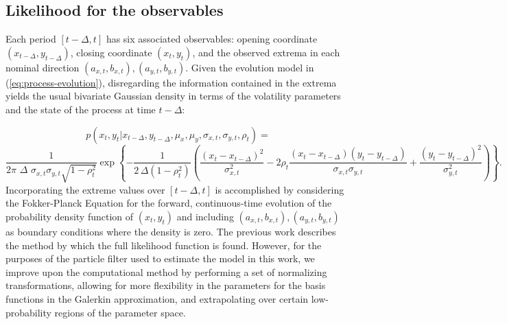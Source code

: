 \documentclass[10pt]{article}
\begin{document}
\subsection{Likelihood for the observables}
Each period $[t-\Delta,t]$ has six associated observables: opening
coordinate $(x_{t-\Delta},y_{t-\Delta})$, closing coordinate
$(x_{t},y_{t})$, and the observed extrema in each nominal direction
$(a_{x,t}, b_{x,t}), (a_{y,t},b_{y,t})$. Given the evolution model in
(\ref{eq:process-evolution}), disregarding the information contained in
the extrema yields the usual bivariate Gaussian density in terms of
the volatility parameters and the state of the process at time $t-\Delta$:

\[
  p(x_t,y_t| x_{t-\Delta}, y_{t-\Delta}, \mu_x, \mu_y, \sigma_{x,t}, \sigma_{y,t}, \rho_t) =
\]
\[
  \frac{1}{2\pi\,\,\Delta\,\,
    \sigma_{x,t}\sigma_{y,t}\sqrt{1-\rho_t^2}} \exp\left\{
    -\frac{1}{2\,\Delta(1-\rho_t^2)} \left( \frac{(x_t -
        x_{t-\Delta})^2}{\sigma_{x,t}^2} - 2\rho_t
      \frac{(x_{t}-x_{t-\Delta})(y_t-y_{t-\Delta})}{\sigma_{x,t}\sigma_{y,t}}
      + \frac{(y_t - y_{t-\Delta})^2}{\sigma_{y,t}^2}\right) \right\}.
\]
Incorporating the extreme values over $[t-\Delta,t]$ is accomplished
by considering the Fokker-Planck Equation for the forward,
continuous-time evolution of the probability density function of
$(x_t, y_t)$ and including $(a_{x,t}, b_{x,t}), (a_{y,t},b_{y,t})$ as
boundary conditions where the density is zero. The previous work
describes the method by which the full likelihood function is
found. However, for the purposes of the particle filter used to
estimate the model in this work, we improve upon the computational
method by performing a set of normalizing transformations, allowing
for more flexibility in the parameters for the basis functions in the
Galerkin approximation, and extrapolating over certain low-probability
regions of the parameter space.
\end{document}

